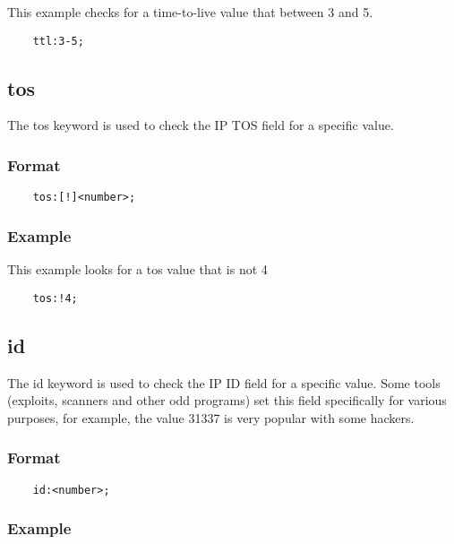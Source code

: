 \documentclass[english]{report}
\begin{document}
This example checks for a time-to-live value that between 3 and 5.

\begin{verbatim}
    ttl:3-5;
\end{verbatim}

\subsection{tos}

The tos keyword is used to check the IP TOS field for a specific value. 

\subsubsection{Format}

\begin{verbatim}
    tos:[!]<number>;
\end{verbatim}

\subsubsection{Example}

This example looks for a tos value that is not 4

\begin{verbatim}
    tos:!4;
\end{verbatim}

\subsection{id}

The id keyword is used to check the IP ID field for a specific value.  Some
tools (exploits, scanners and other odd programs) set this field specifically
for various purposes, for example, the value 31337 is very popular with some
hackers. 

\subsubsection{Format}

\begin{verbatim}
    id:<number>;
\end{verbatim}

\subsubsection{Example}
\end{document}
